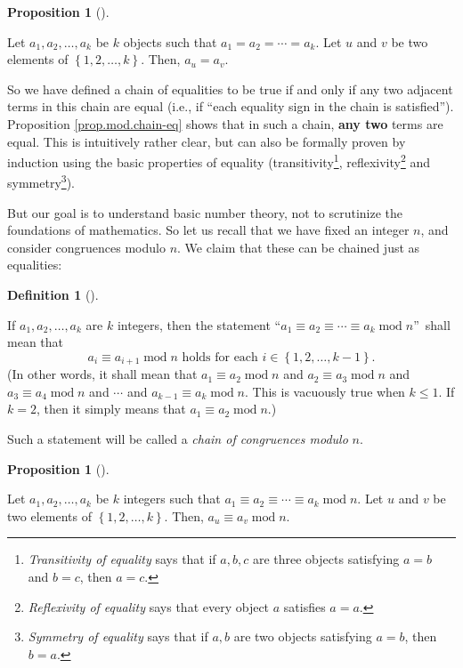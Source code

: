 \documentclass[numbers=enddot,12pt,final,onecolumn,notitlepage]{scrartcl}%
\numberwithin{exer}{subsection}
\theoremstyle{definition}
\newtheorem{prop}[theo]{Proposition}
\newenvironment{proposition}[1][]
{\begin{prop}[#1]\begin{leftbar}}
{\end{leftbar}\end{prop}}
\newtheorem{defi}[theo]{Definition}
\newenvironment{definition}[1][]
{\begin{defi}[#1]\begin{leftbar}}
{\end{leftbar}\end{defi}}
\begin{document}

\begin{proposition}
\label{prop.mod.chain-eq}Let $a_{1},a_{2},\ldots,a_{k}$ be $k$ objects such
that $a_{1}=a_{2}=\cdots=a_{k}$. Let $u$ and $v$ be two elements of $\left\{
1,2,\ldots,k\right\}  $. Then, $a_{u}=a_{v}$.
\end{proposition}

So we have defined a chain of equalities to be true if and only if any two
adjacent terms in this chain are equal (i.e., if \textquotedblleft each
equality sign in the chain is satisfied\textquotedblright). Proposition
\ref{prop.mod.chain-eq} shows that in such a chain, \textbf{any two} terms are
equal. This is intuitively rather clear, but can also be formally proven by
induction using the basic properties of equality
(transitivity\footnote{\textit{Transitivity of equality} says that if $a,b,c$
are three objects satisfying $a=b$ and $b=c$, then $a=c$.},
reflexivity\footnote{\textit{Reflexivity of equality} says that every object
$a$ satisfies $a=a$.} and symmetry\footnote{\textit{Symmetry of equality} says
that if $a,b$ are two objects satisfying $a=b$, then $b=a$.}).

But our goal is to understand basic number theory, not to scrutinize the
foundations of mathematics. So let us recall that we have fixed an integer
$n$, and consider congruences modulo $n$. We claim that these can be chained
just as equalities:

\begin{definition}
If $a_{1},a_{2},\ldots,a_{k}$ are $k$ integers, then the statement
\textquotedblleft$a_{1}\equiv a_{2}\equiv\cdots\equiv a_{k}\operatorname{mod}%
n$\textquotedblright\ shall mean that
\[
a_{i}\equiv a_{i+1}\operatorname{mod}n\text{ holds for each }i\in\left\{
1,2,\ldots,k-1\right\}  .
\]
(In other words, it shall mean that $a_{1}\equiv a_{2}\operatorname{mod}n$ and
$a_{2}\equiv a_{3}\operatorname{mod}n$ and $a_{3}\equiv a_{4}%
\operatorname{mod}n$ and $\cdots$ and $a_{k-1}\equiv a_{k}\operatorname{mod}%
n$. This is vacuously true when $k\leq1$. If $k=2$, then it simply means that
$a_{1}\equiv a_{2}\operatorname{mod}n$.)

Such a statement will be called a \textit{chain of congruences modulo }$n$.
\end{definition}

\begin{proposition}
\label{prop.mod.chain}Let $a_{1},a_{2},\ldots,a_{k}$ be $k$ integers such that
$a_{1}\equiv a_{2}\equiv\cdots\equiv a_{k}\operatorname{mod}n$. Let $u$ and
$v$ be two elements of $\left\{  1,2,\ldots,k\right\}  $. Then, $a_{u}\equiv
a_{v}\operatorname{mod}n$.
\end{proposition}
\end{document}
